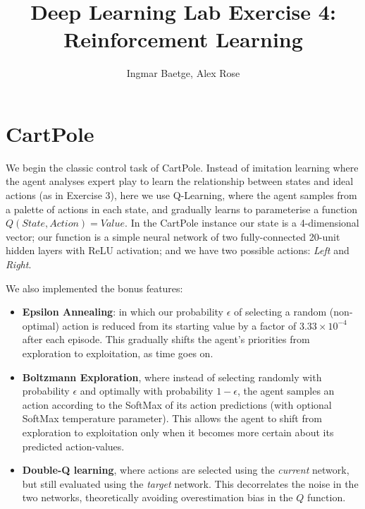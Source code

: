 \documentclass[a4paper, 11pt, conference]{ieeeconf}      %
\title{\LARGE \bf
Deep Learning Lab Exercise 4: Reinforcement Learning}
\author{Ingmar Baetge, Alex Rose}
\begin{document}

\maketitle


\section{CartPole}

We begin the classic control task of CartPole. Instead of imitation learning where the agent analyses expert play to learn the relationship between states and ideal actions (as in Exercise 3), here we use Q-Learning, where the agent samples from a palette of actions in each state, and gradually learns to parameterise a function $Q(State, Action) = Value$. In the CartPole instance our state is a 4-dimensional vector; our function is a simple neural network of two fully-connected 20-unit hidden layers with ReLU activation; and we have two possible actions: \textit{Left} and \textit{Right}.

We also implemented the bonus features:

\begin{itemize}
	\item \textbf{Epsilon Annealing}: in which our probability $\epsilon$ of selecting a random (non-optimal) action is reduced from its starting value by a factor of $3.33 \times 10^{-4}$ after each episode. This gradually shifts the agent's priorities from exploration to exploitation, as time goes on.

	\item \textbf{Boltzmann Exploration}, where instead of selecting randomly with probability $\epsilon$ and optimally with probability $1 - \epsilon$, the agent samples an action according to the SoftMax of its action predictions (with optional SoftMax temperature parameter). This allows the agent to shift from exploration to exploitation only when it becomes more certain about its predicted action-values.

	\item \textbf{Double-Q learning}, where actions are selected using the \textit{current} network, but still evaluated using the \textit{target} network. This decorrelates the noise in the two networks, theoretically avoiding overestimation bias in the $Q$ function.

\end{itemize}
\end{document}
